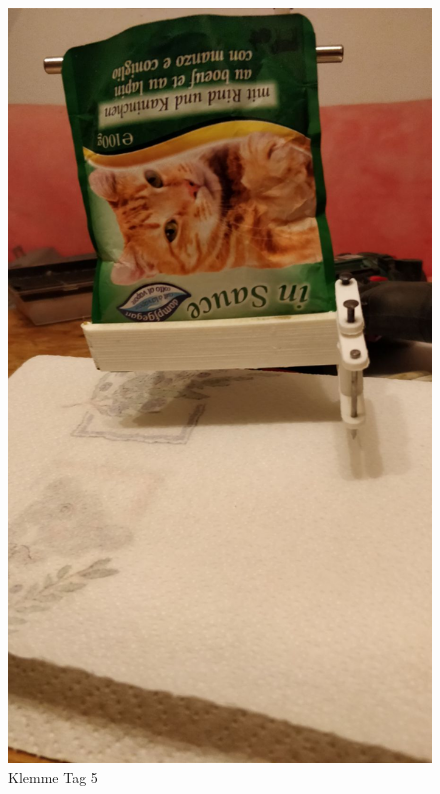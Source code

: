 \begin{figure}[H]
\begin{minipage}[hbt]{.3\linewidth}
   \end{minipage}
   \hspace{.3\linewidth}%
   \begin{minipage}[hbt]{.3\linewidth} %
      \includegraphics[width=\linewidth]{Bilder/Dichtheitsexperiment/Tag_5}
      \caption{Klemme Tag 5}
      \label{Klemme_Tag_5}
   \end{minipage}
\end{figure}


